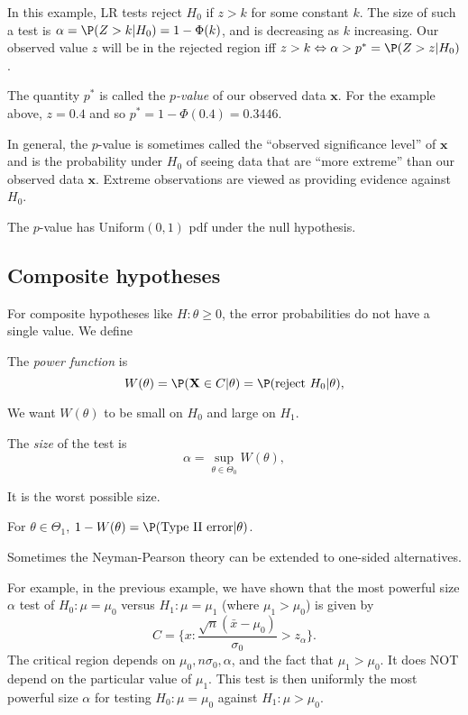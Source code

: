 \documentclass[a4paper]{article}
\begin{document}
In this example, LR tests reject $H_0$ if $z > k$ for some constant $k$. The size of such a test is $\alpha = \P(Z > k| H_0) = 1 - \Phi(k)$, and is decreasing as $k$ increasing.
Our observed value $z$ will be in the rejected region iff $z > k \Leftrightarrow \alpha > p^* = \P(Z > z|H_0)$.
\begin{defi}[$p$-value]
  The quantity $p^*$ is called the \emph{$p$-value} of our observed data $\mathbf{x}$. For the example above, $z = 0.4$ and so $p^* = 1 - \Phi(0.4) = 0.3446$.
\end{defi}

In general, the $p$-value is sometimes called the ``observed significance level'' of $\mathbf{x}$ and is the probability under $H_0$ of seeing data that are ``more extreme'' than our observed data $\mathbf{x}$. Extreme observations are viewed as providing evidence against $H_0$.

\note The $p$-value has Uniform$(0, 1)$ pdf under the null hypothesis.
\subsection{Composite hypotheses}
For composite hypotheses like $H:\theta \geq 0$, the error probabilities do not have a single value. We define
\begin{defi}
  The \emph{power function} is
  \[
    W(\theta) = \P(\mathbf{X}\in C|\theta) = \P(\text{reject }H_0|\theta),
  \]
\end{defi}
We want $W(\theta)$ to be small on $H_0$ and large on $H_1$.

\begin{defi}[Size]
  The \emph{size} of the test is
  \[
    \alpha =\sup_{\theta\in \Theta_0}W(\theta),
  \]
\end{defi}
It is the worst possible size.

For $\theta\in \Theta_1$, $1 - W(\theta) = \P(\text{Type II error}|\theta)$.

Sometimes the Neyman-Pearson theory can be extended to one-sided alternatives.

For example, in the previous example, we have shown that the most powerful size $\alpha$ test of $H_0: \mu = \mu_0$ versus $H_1: \mu = \mu_1$ (where $\mu_1 > \mu_0$) is given by
\[
  C = \{x: \frac{\sqrt{n}(\bar x - \mu_0)}{\sigma_0} >  z_\alpha\}.
\]
The critical region depends on $\mu_0, n \sigma_0, \alpha$, and the fact that $\mu_1 > \mu_0$. It does NOT depend on the particular value of $\mu_1$. This test is then uniformly the most powerful size $\alpha$ for testing $H_0: \mu = \mu_0$ against $H_1: \mu> \mu_0$.
\end{document}
